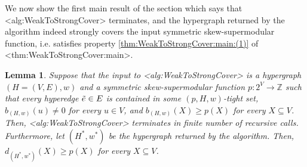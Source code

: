 \documentclass{article}
\def\Cref#1{<#1>}%
\newtheorem{lemma}{Lemma}[section]
\providecommand{\Z}{\mathbb{Z}}
\begin{document}
We now show the first main result of the section which says that \Cref{alg:WeakToStrongCover} terminates, and the hypergraph returned by the algorithm indeed strongly covers the input symmetric skew-supermodular function, i.e. satisfies property \ref{thm:WeakToStrongCover:main:(1)} of \Cref{thm:WeakToStrongCover:main}.

\begin{lemma}\label{lem:weak-to-strong:correctness:main:strong-cover}
    Suppose that the input to \Cref{alg:WeakToStrongCover} is a  hypergraph $(H = (V, E), w)$ and a symmetric skew-supermodular function $p:2^V\rightarrow \Z$ %
such that every hyperedge $\Tilde{e} \in E$ is contained in some $(p, H, w)$-tight set, $b_{(H,w)}(u) \not = 0$ for every $u \in V$, and $b_{(H,w)}(X) \geq p(X)$ for every $X \subseteq V$.  Then, \Cref{alg:WeakToStrongCover} terminates in finite number of recursive calls. Furthermore, let $(H^*, w^*)$ be the hypergraph returned by the algorithm. Then, $d_{(H^*, w^*)}(X) \geq p(X)$ for every $X\subseteq V$.
\end{lemma}
\end{document}
